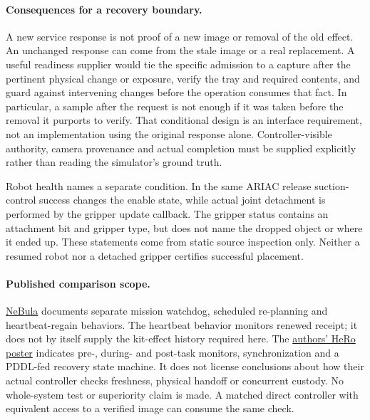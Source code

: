 \documentclass{article}
\begin{document}
\paragraph{Consequences for a recovery boundary.}
A new service response is not proof of a new image or removal of
the old effect. An unchanged response can come from the stale image
or a real replacement. A useful readiness supplier would tie the
specific admission to a capture after the pertinent physical change
or exposure, verify the tray and required contents, and guard
against intervening changes before the operation consumes that
fact. In particular, a sample after the request is not enough if it
was taken before the removal it purports to verify. That conditional
design is an interface requirement, not an implementation using
the original response alone. Controller-visible authority, camera
provenance and actual completion must be supplied explicitly rather
than reading the simulator's ground truth.

Robot health names a separate condition. In the same ARIAC release
suction-control success changes the enable state, while actual joint
detachment is performed by the gripper update callback. The gripper
status contains an attachment bit and gripper type, but does not
name the dropped object or where it ended up. These statements come
from static source inspection only. Neither a resumed robot nor a
detached gripper certifies successful placement.

\paragraph{Published comparison scope.}
\href{https://arxiv.org/html/2103.11470\#S11}{NeBula} documents
separate mission watchdog, scheduled re-planning and heartbeat-regain
behaviors. The heartbeat behavior monitors renewed receipt; it does
not by itself supply the kit-effect history required here. The
\href{https://is.cas.cn/ztzl/rjsxsnh/2025xsnh/205hbzs/202607/P020260715632339212745.pdf}{authors' HeRo poster}
indicates pre-, during- and post-task monitors, synchronization and a
PDDL-fed recovery state machine. It does not license conclusions
about how their actual controller checks freshness, physical handoff
or concurrent custody. No whole-system test or superiority claim
is made. A matched direct controller with equivalent access to a
verified image can consume the same check.
\end{document}
